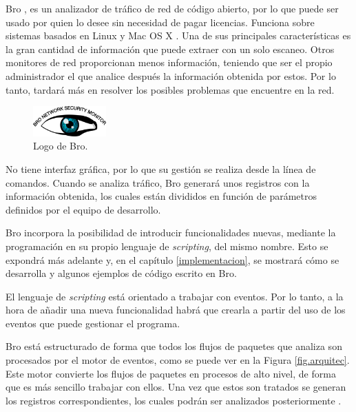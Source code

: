 Bro \cite{broindex}, es un analizador de tráfico de red de código abierto, por lo que puede ser usado por quien lo desee 
sin necesidad de pagar licencias. Funciona sobre sistemas basados en Linux y Mac OS X \cite{brodownload}. Una de sus principales 
características es la gran cantidad de información que puede extraer con un solo escaneo. Otros monitores de red proporcionan menos 
información, teniendo que ser el propio administrador el que analice después la información obtenida por estos. Por lo tanto, tardará 
más en resolver los posibles problemas que encuentre en la red.

\begin{figure}[H]
  \includegraphics[width=0.25\textwidth]{imagenes/logo-bro.png}
  \centering
  \caption{Logo de Bro.}
\end{figure}

\intro No tiene interfaz gráfica, por lo que su gestión se realiza desde la línea de comandos. Cuando se analiza 
tráfico, Bro generará unos registros con la información obtenida, los cuales están divididos en función de parámetros definidos por 
el equipo de desarrollo.

\intro Bro incorpora la posibilidad de introducir funcionalidades nuevas, mediante la programación en su 
propio lenguaje de \textit{scripting}, del mismo nombre. Esto se expondrá más adelante y, en el capítulo \ref{implementacion}, se 
mostrará cómo se desarrolla y algunos ejemplos de código escrito en Bro.

\intro El lenguaje de \textit{scripting} está orientado a trabajar con eventos. Por lo tanto, a la hora de añadir una nueva 
funcionalidad habrá que crearla a partir del uso de los eventos que puede gestionar el programa.

\intro Bro está estructurado de forma que todos los flujos de paquetes que analiza son procesados por el motor de eventos, 
como se puede ver en la Figura \ref{fig.arquitec}. Este motor convierte los flujos de paquetes en procesos de alto nivel, de forma que 
es más sencillo trabajar con ellos. Una vez que estos son tratados se generan los registros correspondientes, los cuales 
podrán ser analizados posteriormente \cite{broarquitectura}.

